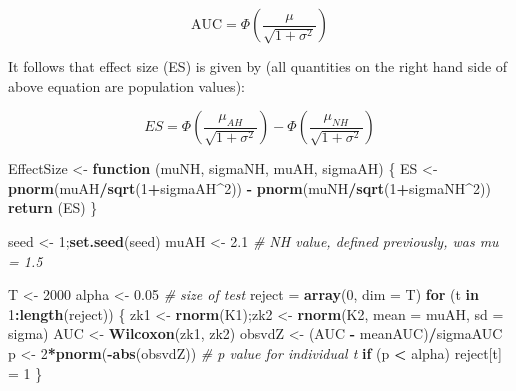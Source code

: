 \documentclass[
]{book}
\newenvironment{Shaded}{\begin{snugshade}}{\end{snugshade}}
\newcommand{\CommentTok}[1]{\textcolor[rgb]{0.56,0.35,0.01}{\textit{#1}}}
\newcommand{\ControlFlowTok}[1]{\textcolor[rgb]{0.13,0.29,0.53}{\textbf{#1}}}
\newcommand{\DataTypeTok}[1]{\textcolor[rgb]{0.13,0.29,0.53}{#1}}
\newcommand{\DecValTok}[1]{\textcolor[rgb]{0.00,0.00,0.81}{#1}}
\newcommand{\FloatTok}[1]{\textcolor[rgb]{0.00,0.00,0.81}{#1}}
\newcommand{\KeywordTok}[1]{\textcolor[rgb]{0.13,0.29,0.53}{\textbf{#1}}}
\newcommand{\NormalTok}[1]{#1}
\newcommand{\OperatorTok}[1]{\textcolor[rgb]{0.81,0.36,0.00}{\textbf{#1}}}
\newcommand{\StringTok}[1]{\textcolor[rgb]{0.31,0.60,0.02}{#1}}
\begin{document}
\begin{equation*} 
\text{AUC} = \Phi\left ( \frac{ \mu }{\sqrt{ 1 + \sigma^2}} \right )
\end{equation*}

It follows that effect size (ES) is given by (all quantities on the right hand side of above equation are population values):

\begin{equation*} 
ES = \Phi\left ( \frac{\mu_{AH}}{\sqrt{1+\sigma^2}} \right ) - \Phi\left ( \frac{\mu_{NH}}{\sqrt{1+\sigma^2}} \right )
\end{equation*}

\begin{Shaded}
\begin{Highlighting}[]
\NormalTok{EffectSize \textless{}{-}}\StringTok{ }\ControlFlowTok{function}\NormalTok{ (muNH, sigmaNH, muAH, sigmaAH)}
\NormalTok{\{}
\NormalTok{  ES \textless{}{-}}\StringTok{ }\KeywordTok{pnorm}\NormalTok{(muAH}\OperatorTok{/}\KeywordTok{sqrt}\NormalTok{(}\DecValTok{1}\OperatorTok{+}\NormalTok{sigmaAH}\OperatorTok{\^{}}\DecValTok{2}\NormalTok{)) }\OperatorTok{{-}}\StringTok{ }\KeywordTok{pnorm}\NormalTok{(muNH}\OperatorTok{/}\KeywordTok{sqrt}\NormalTok{(}\DecValTok{1}\OperatorTok{+}\NormalTok{sigmaNH}\OperatorTok{\^{}}\DecValTok{2}\NormalTok{))}
  \KeywordTok{return}\NormalTok{ (ES)}
\NormalTok{\}}

\NormalTok{seed \textless{}{-}}\StringTok{ }\DecValTok{1}\NormalTok{;}\KeywordTok{set.seed}\NormalTok{(seed)}
\NormalTok{muAH \textless{}{-}}\StringTok{ }\FloatTok{2.1} \CommentTok{\# NH value, defined previously, was mu = 1.5}

\NormalTok{T \textless{}{-}}\StringTok{ }\DecValTok{2000}
\NormalTok{alpha \textless{}{-}}\StringTok{ }\FloatTok{0.05} \CommentTok{\# size of test}
\NormalTok{reject =}\StringTok{ }\KeywordTok{array}\NormalTok{(}\DecValTok{0}\NormalTok{, }\DataTypeTok{dim =}\NormalTok{ T)}
\ControlFlowTok{for}\NormalTok{ (t }\ControlFlowTok{in} \DecValTok{1}\OperatorTok{:}\KeywordTok{length}\NormalTok{(reject)) \{  }
\NormalTok{  zk1 \textless{}{-}}\StringTok{ }\KeywordTok{rnorm}\NormalTok{(K1);zk2 \textless{}{-}}\StringTok{ }\KeywordTok{rnorm}\NormalTok{(K2, }\DataTypeTok{mean =}\NormalTok{ muAH, }\DataTypeTok{sd =}\NormalTok{ sigma)  }
\NormalTok{  AUC \textless{}{-}}\StringTok{ }\KeywordTok{Wilcoxon}\NormalTok{(zk1, zk2)  }
\NormalTok{  obsvdZ \textless{}{-}}\StringTok{ }\NormalTok{(AUC }\OperatorTok{{-}}\StringTok{ }\NormalTok{meanAUC)}\OperatorTok{/}\NormalTok{sigmaAUC}
\NormalTok{  p \textless{}{-}}\StringTok{ }\DecValTok{2}\OperatorTok{*}\KeywordTok{pnorm}\NormalTok{(}\OperatorTok{{-}}\KeywordTok{abs}\NormalTok{(obsvdZ)) }\CommentTok{\# p value for individual t}
  \ControlFlowTok{if}\NormalTok{ (p }\OperatorTok{\textless{}}\StringTok{ }\NormalTok{alpha) reject[t] =}\StringTok{ }\DecValTok{1} 
\NormalTok{\}}


\end{Highlighting}
\end{Shaded}
\end{document}
